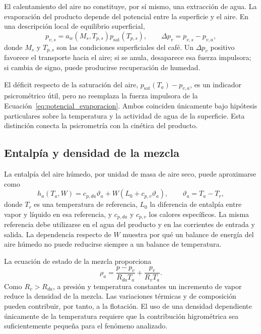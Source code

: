 El calentamiento del aire no constituye, por sí mismo, una extracción de agua. La evaporación del producto depende del potencial entre la superficie y el aire. En una descripción local de equilibrio superficial,
\begin{equation}
p_{v,s}=a_w(M_s,T_{p,s})p_{\mathrm{sat}}(T_{p,s}),
\qquad
\Delta p_v=p_{v,s}-p_{v,a},
\label{eq:potencial_evaporacion}
\end{equation}
donde $M_s$ y $T_{p,s}$ son las condiciones superficiales del café. Un $\Delta p_v$ positivo favorece el transporte hacia el aire; si se anula, desaparece esa fuerza impulsora; si cambia de signo, puede producirse recuperación de humedad.

El déficit respecto de la saturación del aire,
$p_{\mathrm{sat}}(T_a)-p_{v,a}$, es un indicador psicrométrico útil, pero no reemplaza la fuerza impulsora de la Ecuación~\eqref{eq:potencial_evaporacion}. Ambos coinciden únicamente bajo hipótesis particulares sobre la temperatura y la actividad de agua de la superficie. Esta distinción conecta la psicrometría con la cinética del producto.

\subsection{Entalpía y densidad de la mezcla}

La entalpía del aire húmedo, por unidad de masa de aire seco, puede aproximarse como
\begin{equation}
h_a(T_a,W)=c_{p,da}\vartheta_a
+W\left(L_0+c_{p,v}\vartheta_a\right),
\qquad
\vartheta_a=T_a-T_r,
\label{eq:entalpia_aire_humedo}
\end{equation}
donde $T_r$ es una temperatura de referencia, $L_0$ la diferencia de entalpía entre vapor y líquido en esa referencia, y $c_{p,da}$ y $c_{p,v}$ los calores específicos. La misma referencia debe utilizarse en el agua del producto y en las corrientes de entrada y salida. La dependencia respecto de $W$ muestra por qué un balance de energía del aire húmedo no puede reducirse siempre a un balance de temperatura.

La ecuación de estado de la mezcla proporciona
\begin{equation}
\rho_a=\frac{p-p_v}{R_{da}T_a}+\frac{p_v}{R_vT_a}.
\label{eq:densidad_aire_humedo}
\end{equation}
Como $R_v>R_{da}$, a presión y temperatura constantes un incremento de vapor reduce la densidad de la mezcla. Las variaciones térmicas y de composición pueden contribuir, por tanto, a la flotación. El uso de una densidad dependiente únicamente de la temperatura requiere que la contribución higrométrica sea suficientemente pequeña para el fenómeno analizado.

